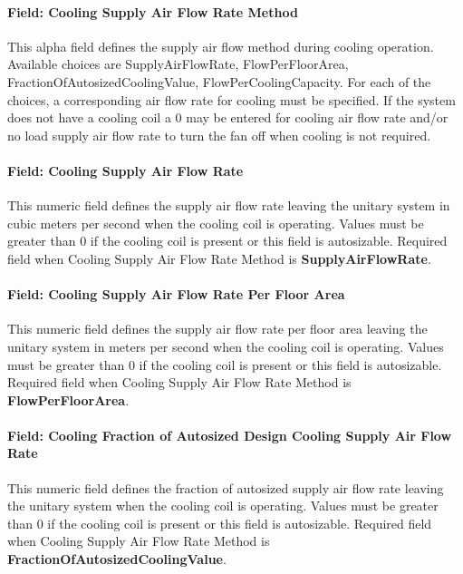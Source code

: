 \paragraph{Field: Cooling Supply Air Flow Rate Method}\label{field-cooling-supply-air-flow-rate-method-000}

This alpha field defines the supply air flow method during cooling operation. Available choices are SupplyAirFlowRate, FlowPerFloorArea, FractionOfAutosizedCoolingValue, FlowPerCoolingCapacity. For each of the choices, a corresponding air flow rate for cooling must be specified. If the system does not have a cooling coil a 0 may be entered for cooling air flow rate and/or no load supply air flow rate to turn the fan off when cooling is not required.

\paragraph{Field: Cooling Supply Air Flow Rate}\label{field-cooling-supply-air-flow-rate-001}

This numeric field defines the supply air flow rate leaving the unitary system in cubic meters per second when the cooling coil is operating. Values must be greater than 0 if the cooling coil is present or this field is autosizable. Required field when Cooling Supply Air Flow Rate Method is \textbf{SupplyAirFlowRate}.

\paragraph{Field: Cooling Supply Air Flow Rate Per Floor Area}\label{field-cooling-supply-air-flow-rate-per-floor-area}

This numeric field defines the supply air flow rate per floor area leaving the unitary system in meters per second when the cooling coil is operating. Values must be greater than 0 if the cooling coil is present or this field is autosizable. Required field when Cooling Supply Air Flow Rate Method is \textbf{FlowPerFloorArea}.

\paragraph{Field: Cooling Fraction of Autosized Design Cooling Supply Air Flow Rate}\label{field-cooling-fraction-of-autosized-design-cooling-supply-air-flow-rate}

This numeric field defines the fraction of autosized supply air flow rate leaving the unitary system when the cooling coil is operating. Values must be greater than 0 if the cooling coil is present or this field is autosizable. Required field when Cooling Supply Air Flow Rate Method is \textbf{FractionOfAutosizedCoolingValue}.

